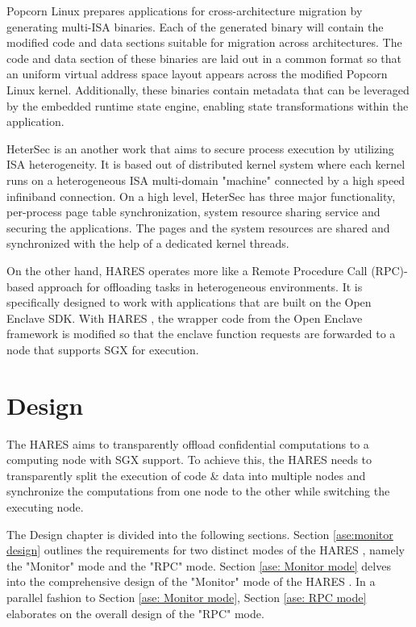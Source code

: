\documentclass[article, doublespace,nopageskip]{VTthesis} %
\newcommand{\monitor}{HARES }
\begin{document}
    Popcorn Linux \cite{het_isa_migrate:asplos12} prepares applications for cross-architecture migration by generating multi-ISA binaries. Each of the generated binary will contain the modified code and data sections suitable for migration across architectures. The code and data section of these binaries are laid out in a common format so that an uniform virtual address space layout appears across the modified Popcorn Linux kernel. Additionally, these binaries contain metadata that can be leveraged by the embedded runtime state engine, enabling state transformations within the application.  

    HeterSec \cite{HeterSec} is an another work that aims to secure process execution by utilizing ISA heterogeneity. It is based out of distributed kernel system where each kernel runs on a heterogeneous ISA multi-domain "machine" connected by a high speed infiniband connection. On a high level, HeterSec has three major functionality, per-process page table synchronization, system resource sharing service and securing the applications. The pages and the system resources are shared and synchronized with the help of a dedicated kernel threads. 
    
    On the other hand, \monitor operates more like a Remote Procedure Call (RPC)-based approach for offloading tasks in heterogeneous environments. It is specifically designed to work with applications that are built on the Open Enclave SDK. With \monitor, the wrapper code from the Open Enclave framework is modified so that the enclave function requests are forwarded to a node that supports SGX for execution.

    \chapter{Design} \label{ch:design}
    The \monitor aims to transparently offload confidential computations to a computing node with SGX support. To achieve this, the \monitor needs to transparently split the execution of code \& data into multiple nodes and synchronize the computations from one node to the other while switching the executing node. 

    The Design chapter is divided into the following sections. Section \ref{ase:monitor design} outlines the requirements for two distinct modes of the \monitor, namely the "Monitor" mode and the "RPC" mode. Section \ref{ase: Monitor mode} delves into the comprehensive design of the "Monitor" mode of the \monitor. In a parallel fashion to Section \ref{ase: Monitor mode}, Section \ref{ase: RPC mode} elaborates on the overall design of the "RPC" mode.
\end{document}

